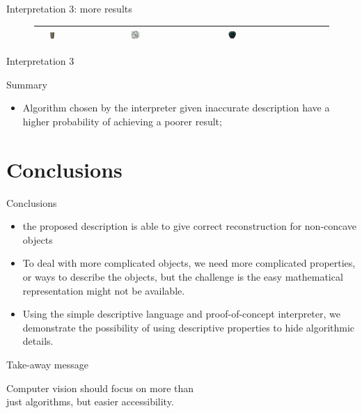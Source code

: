 \documentclass[10pt]{beamer}
\begin{document}
\begin{frame}{Interpretation 3: more results}
\begin{figure}
\begin{tabular}{c|*{4}{l}}
& \includegraphics[width=0.1\textwidth]{interp/real_interp/cup/cup_ps}
& \includegraphics[width=0.1\textwidth]{interp/real_interp/pot/pot_sl}
& \includegraphics[width=0.1\textwidth]{interp/real_interp/vase/vase_mvs} \\
\bottomrule
\end{tabular}
\end{figure}

\end{frame}

\begin{frame}{Interpretation 3}

\begin{exampleblock}{Summary}
\begin{itemize}
\item Algorithm chosen by the interpreter given inaccurate description have a higher probability of achieving a poorer result; \\
\end{itemize}
\end{exampleblock}

\end{frame}

\section{Conclusions}
\begin{frame}{Conclusions}

\begin{itemize}
\item the proposed description is able to give correct reconstruction for non-concave objects
\item To deal with more complicated objects, we need more complicated properties, or ways to describe the objects, but the challenge is the easy mathematical representation might not be available.
\item Using the simple descriptive language and proof-of-concept interpreter, we demonstrate the possibility of using descriptive properties to hide algorithmic details.
\end{itemize}
\end{frame}

\begin{frame}[standout]{Take-away message}

Computer vision should focus on more than \\just algorithms, but easier accessibility.

\end{frame}
\end{document}
